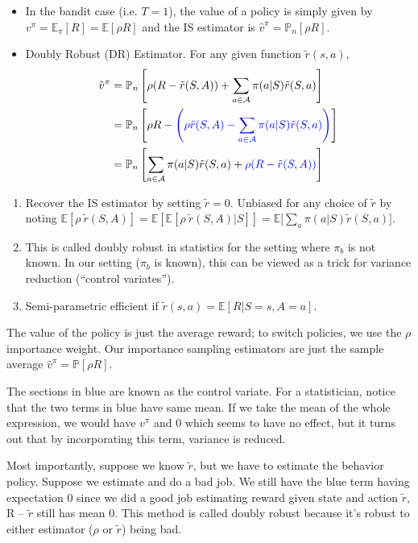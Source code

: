 \documentclass[11pt]{article}
\def\EE{\mathbb{E}}
\def\Pn{\mathbb{P}_n}
\def\A{\mathcal{A}}
\begin{document}
\begin{itemize}
\item In the bandit case (i.e. $T = 1$), the value of a policy is simply given by $v^\pi = \EE_\pi[R] = \EE[\rho R]$ and the IS estimator is $\hat v^{\pi} = \Pn [\rho R]$.
  
\item Doubly Robust (DR) Estimator. For any given function $\tilde r(s, a)$, 
  \begin{align*}
    \hat v^{\pi} &= \Pn \left[\rho (R-\tilde r(S, A)) + \sum_{a \in \A} \pi(a|S) \tilde r(S, a) \right]\\
                 &= \mathbb{P}_n\left[\rho R - {\color{blue}\left(\rho \tilde{r}(S,A)-\sum_{a \in \mathcal{A}}\pi(a|S)\tilde{r}(S,a)\right)}\right] \\
                 &=\mathbb{P}_n\left[\sum_{a \in \mathcal{A}}\pi(a|S)\tilde{r}(S,a) + {\color{blue}\rho (R -  \tilde{r}(S,A))}\right]
  \end{align*}
\end{itemize}
\begin{enumerate}
\item Recover the IS estimator by setting $\tilde r= 0$. 
  Unbiased for any choice of $\tilde r$ by noting
  $\EE[\rho\ \tilde r(S,A)] = \EE[\EE[\rho\ \tilde r(S,A)|S]] = \EE\big[\sum_{a} \pi(a|S) \tilde r(S, a)\big]
  $.
\item This is called doubly robust in statistics for the setting where $\pi_b$ is not known. In our setting ($\pi_b$ is known), this can be viewed as a trick for variance reduction (``control variates'').
  
\item Semi-parametric efficient if $\tilde r(s, a) = \EE[R|S=s, A=a]$. 
\end{enumerate}


The value of the policy is just the average reward; to switch policies, we use the $\rho$ importance weight. Our importance sampling estimators are just the sample average $\hat{v}^\pi = \mathbb{P}[\rho R]$.

The sections in blue are known as the control variate. For a statistician, notice that the two terms in blue have same mean. If we take the mean of the whole expression, we would have $v^\pi$ and $0$ which seems to have no effect, but it turns out that by incorporating this term, variance is reduced.

Most importantly, suppose we know $\tilde{r}$, but we have to estimate the behavior policy. Suppose we estimate and do a bad job. We still have the blue term having expectation 0 since we did a good job estimating reward given state and action $\tilde{r}$, R -- $\tilde{r}$ still has mean 0. This method is called doubly robust because it's robust to either estimator ($\rho$ or $\tilde{r}$) being bad.
\end{document}
